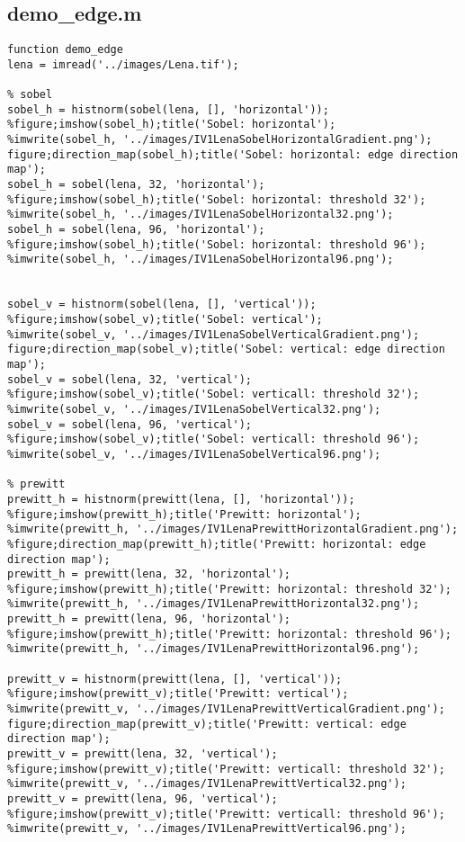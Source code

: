 \documentclass[article,oneside]{memoir}
\begin{document}
\begin{highboostfilter2.m}
\subsection{demo\_edge.m}

\begin{verbatim}
function demo_edge
lena = imread('../images/Lena.tif');

% sobel
sobel_h = histnorm(sobel(lena, [], 'horizontal'));
%figure;imshow(sobel_h);title('Sobel: horizontal');
%imwrite(sobel_h, '../images/IV1LenaSobelHorizontalGradient.png');
figure;direction_map(sobel_h);title('Sobel: horizontal: edge direction map');
sobel_h = sobel(lena, 32, 'horizontal');
%figure;imshow(sobel_h);title('Sobel: horizontal: threshold 32');
%imwrite(sobel_h, '../images/IV1LenaSobelHorizontal32.png');
sobel_h = sobel(lena, 96, 'horizontal');
%figure;imshow(sobel_h);title('Sobel: horizontal: threshold 96');
%imwrite(sobel_h, '../images/IV1LenaSobelHorizontal96.png');


sobel_v = histnorm(sobel(lena, [], 'vertical'));
%figure;imshow(sobel_v);title('Sobel: vertical');
%imwrite(sobel_v, '../images/IV1LenaSobelVerticalGradient.png');
figure;direction_map(sobel_v);title('Sobel: vertical: edge direction map');
sobel_v = sobel(lena, 32, 'vertical');
%figure;imshow(sobel_v);title('Sobel: verticall: threshold 32');
%imwrite(sobel_v, '../images/IV1LenaSobelVertical32.png');
sobel_v = sobel(lena, 96, 'vertical');
%figure;imshow(sobel_v);title('Sobel: verticall: threshold 96');
%imwrite(sobel_v, '../images/IV1LenaSobelVertical96.png');

% prewitt
prewitt_h = histnorm(prewitt(lena, [], 'horizontal'));
%figure;imshow(prewitt_h);title('Prewitt: horizontal');
%imwrite(prewitt_h, '../images/IV1LenaPrewittHorizontalGradient.png');
%figure;direction_map(prewitt_h);title('Prewitt: horizontal: edge direction map');
prewitt_h = prewitt(lena, 32, 'horizontal');
%figure;imshow(prewitt_h);title('Prewitt: horizontal: threshold 32');
%imwrite(prewitt_h, '../images/IV1LenaPrewittHorizontal32.png');
prewitt_h = prewitt(lena, 96, 'horizontal');
%figure;imshow(prewitt_h);title('Prewitt: horizontal: threshold 96');
%imwrite(prewitt_h, '../images/IV1LenaPrewittHorizontal96.png');

prewitt_v = histnorm(prewitt(lena, [], 'vertical'));
%figure;imshow(prewitt_v);title('Prewitt: vertical');
%imwrite(prewitt_v, '../images/IV1LenaPrewittVerticalGradient.png');
figure;direction_map(prewitt_v);title('Prewitt: vertical: edge direction map');
prewitt_v = prewitt(lena, 32, 'vertical');
%figure;imshow(prewitt_v);title('Prewitt: verticall: threshold 32');
%imwrite(prewitt_v, '../images/IV1LenaPrewittVertical32.png');
prewitt_v = prewitt(lena, 96, 'vertical');
%figure;imshow(prewitt_v);title('Prewitt: verticall: threshold 96');
%imwrite(prewitt_v, '../images/IV1LenaPrewittVertical96.png');


\end{verbatim}
\end{highboostfilter2.m}
\end{document}
